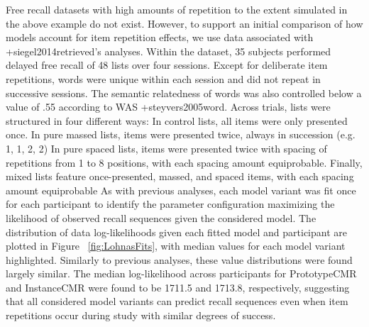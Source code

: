 \markdownRendererInterblockSeparator
{}Free recall datasets with high amounts of repetition to the extent simulated in the above example do not exist. However, to support an initial comparison of how models account for item repetition effects, we use data associated with +{}{}{siegel2014retrieved}'s analyses. Within the dataset, 35 subjects performed delayed free recall of 48 lists over four sessions. Except for deliberate item repetitions, words were unique within each session and did not repeat in successive sessions. The semantic relatedness of words was also controlled below a value of .55 according to WAS +{}{}{steyvers2005word}. Across trials, lists were structured in four different ways:\markdownRendererInterblockSeparator
{}\markdownRendererOlBegin
{}In control lists, all items were only presented once.\markdownRendererOlItemEnd 
{}In pure massed lists, items were presented twice, always in succession (e.g. 1, 1, 2, 2)\markdownRendererOlItemEnd 
{}In pure spaced lists, items were presented twice with spacing of repetitions from 1 to 8 positions, with each spacing amount equiprobable.\markdownRendererOlItemEnd 
{}Finally, mixed lists feature once-presented, massed, and spaced items, with each spacing amount equiprobable\markdownRendererOlItemEnd 
\markdownRendererOlEnd \markdownRendererInterblockSeparator
{}As with previous analyses, each model variant was fit once for each participant to identify the parameter configuration maximizing the likelihood of observed recall sequences given the considered model. The distribution of data log-likelihoods given each fitted model and participant are plotted in Figure ~\ref{fig:LohnasFits}, with median values for each model variant highlighted. Similarly to previous analyses, these value distributions were found largely similar. The median log-likelihood across participants for PrototypeCMR and InstanceCMR were found to be 1711.5 and 1713.8, respectively, suggesting that all considered model variants can predict recall sequences even when item repetitions occur during study with similar degrees of success.\markdownRendererInterblockSeparator
